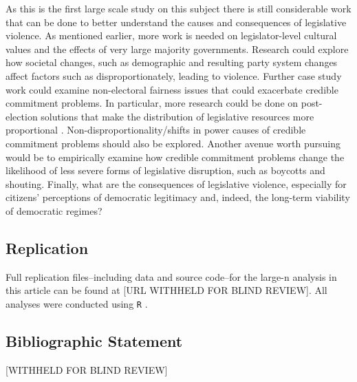 \documentclass[a4paper]{article}\usepackage[]{graphicx}\usepackage[]{color}
\begin{document}
As this is the first large scale study on this subject there is still considerable work that can be done to better understand the causes and consequences of legislative violence. As mentioned earlier, more work is needed on legislator-level cultural values and the effects of very large majority governments. Research could explore how societal changes, such as demographic and resulting party system changes affect factors such as disproportionately, leading to violence. Further case study work could examine non-electoral fairness issues that could exacerbate credible commitment problems. In particular, more research could be done on post-election solutions that make the distribution of legislative resources more proportional \cite[for example, see][who examined informal minority party access to power in Japan's Diet]{Wolfe2004}. Non-disproportionality/shifts in power causes of credible commitment problems should also be explored. Another avenue worth pursuing would be to empirically examine how credible commitment problems change the likelihood of less severe forms of legislative disruption, such as boycotts and shouting. Finally, what are the consequences of legislative violence, especially for citizens' perceptions of democratic legitimacy and, indeed, the long-term viability of democratic regimes?

\subsection*{Replication}

\noindent Full replication files--including data and source code--for the large-n analysis in this article can be found at
[URL WITHHELD FOR BLIND REVIEW]. All analyses were conducted using \texttt{R} \citep{R-cite}.






\subsection*{Bibliographic Statement}

[WITHHELD FOR BLIND REVIEW]
\end{document}
